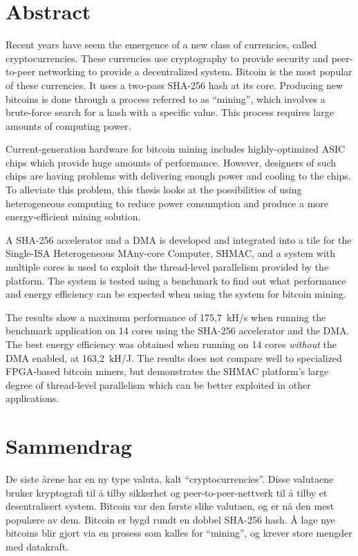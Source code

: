 \chapter*{Abstract}

Recent years have seem the emergence of a new class of currencies, called
cryptocurrencies. These currencies use cryptography to provide security
and peer-to-peer networking to provide a decentralized system. Bitcoin is
the most popular of these currencies. It uses a two-pass
SHA-256 hash at its core. Producing new bitcoins is done through a process
referred to as ``mining'', which involves a brute-force search for a hash with
a specific value. This process requires large amounts of computing power.

Current-generation hardware for bitcoin mining includes highly-optimized
ASIC chips which provide huge amounts of performance. However, designers of
such chips are having problems with delivering enough power and cooling
to the chips. To alleviate this problem, this thesis looks at the possibilities
of using heterogeneous computing to reduce power consumption and produce a more
energy-efficient mining solution.

A SHA-256 accelerator and a DMA is developed and integrated into a tile for
the Single-ISA Heterogeneous MAny-core Computer, SHMAC, and a system with
multiple cores is used to exploit the thread-level parallelism provided by
the platform. The system is tested using a benchmark to find out what performance
and energy efficiency can be expected when using the system for bitcoin mining.

The results show a maximum performance of 175,7~kH/s when running the benchmark
application on 14 cores using the SHA-256 accelerator and the DMA. The best
energy efficiency was obtained when running on 14 cores \emph{without} the DMA enabled,
at 163,2~kH/J. The results does not compare well to specialized FPGA-based
bitcoin miners, but demonstrates the SHMAC platform's large degree of thread-level parallelism
which can be better exploited in other applications.

\chapter*{Sammendrag}

De siste årene har en ny type valuta, kalt ``cryptocurrencies''. Disse valutaene
bruker kryptografi til å tilby sikkerhet og peer-to-peer-nettverk til å tilby et
desentralisert system. Bitcoin var den første slike valutaen, og er nå den mest
populære av dem. Bitcoin er bygd rundt en dobbel SHA-256 hash. Å lage nye bitcoins
blir gjort via en prosess som kalles for ``mining'', og krever store mengder med
datakraft.

